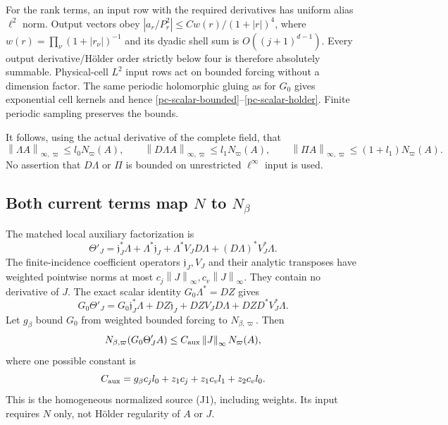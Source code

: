 \documentclass[11pt]{article}
\newcommand{\norm}[1]{\left\lVert#1\right\rVert}
\begin{document}
For the rank terms, an input row with the required derivatives has
uniform alias $\ell^2$ norm. Output vectors obey
$|a_r/P_r^2|\le Cw(r)/(1+|r|)^4$, where
$w(r)=\prod_\nu(1+|r_\nu|)^{-1}$ and its dyadic shell sum is
$O((j+1)^{d-1})$. Every output derivative/H\"older order strictly
below four is therefore absolutely summable. Physical-cell $L^2$
input rows act on bounded forcing without a dimension factor.
The same periodic holomorphic gluing as for $G_0$ gives exponential
cell kernels and hence \eqref{pc-scalar-bounded}--\eqref{pc-scalar-holder}.
Finite periodic sampling preserves the bounds.

It follows, using the actual derivative of the complete field, that
\begin{equation}\label{pc-lambda-on-N}
 \norm{\Lambda A}_{\infty,\varpi}\le l_0N_\varpi(A),\qquad
 \norm{D\Lambda A}_{\infty,\varpi}\le l_1N_\varpi(A),\qquad
 \norm{\Pi A}_{\infty,\varpi}\le(1+l_1)N_\varpi(A).
\end{equation}
No assertion that $D\Lambda$ or $\Pi$ is bounded on unrestricted
$\ell^\infty$ input is used.

\subsection{Both current terms map $N$ to $N_\beta$}

The matched local auxiliary factorization is
\begin{equation}\label{pc-aux-factorization}
 \Theta'_J=\mathfrak j_J^*\Lambda+\Lambda^*\mathfrak j_J
       +\Lambda^*V_JD\Lambda+(D\Lambda)^*V_J^*\Lambda.
\end{equation}
The finite-incidence coefficient operators $\mathfrak j_J,V_J$
and their analytic transposes have weighted pointwise norms at most
$c_j\norm{J}_\infty,c_v\norm{J}_\infty$. They contain no derivative
of $J$. The exact scalar identity $G_0\Lambda^*=DZ$ gives
\begin{equation}\label{pc-outer-aux-smoothing}
 G_0\Theta'_J
  =G_0\mathfrak j_J^*\Lambda+DZ\mathfrak j_J
       +DZV_JD\Lambda+DZD^*V_J^*\Lambda.
\end{equation}
Let $g_\beta$ bound $G_0$ from weighted bounded forcing to
$N_{\beta,\varpi}$. Then
\begin{equation}\label{pc-aux-N-bound}
 N_{\beta,\varpi}(G_0\Theta'_JA)
        \le C_{\rm aux}\norm{J}_\infty N_\varpi(A),
\end{equation}
where one possible constant is
\[
 C_{\rm aux}=g_\beta c_jl_0+z_1c_j+z_1c_vl_1+z_2c_vl_0.
\]
This is the homogeneous normalized source (J1), including weights.
Its input requires $N$ only, not H\"older regularity of $A$ or $J$.
\end{document}

